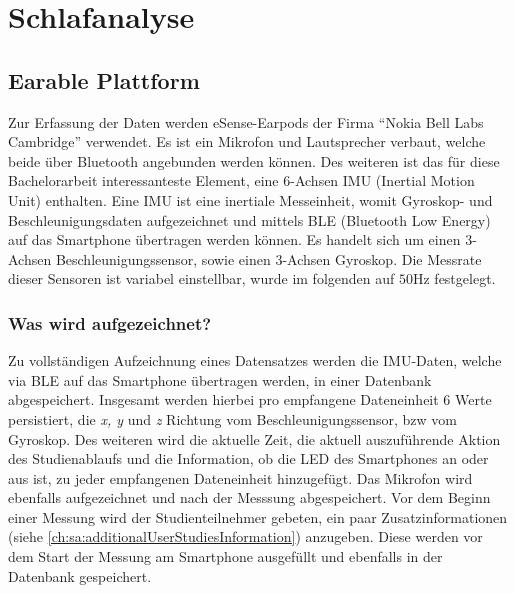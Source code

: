 
\chapter{Schlafanalyse}
\label{ch:sa}

\section{Earable Plattform}
\label{ch:sa:ep}
Zur Erfassung der Daten werden eSense-Earpods der Firma ``Nokia Bell Labs Cambridge'' verwendet.	
Es ist ein Mikrofon und Lautsprecher verbaut, welche beide über Bluetooth angebunden werden können. 
Des weiteren ist das für diese Bachelorarbeit interessanteste Element, eine 6-Achsen IMU (Inertial Motion Unit) enthalten.
Eine IMU ist eine inertiale Messeinheit, womit Gyroskop- und Beschleunigungsdaten aufgezeichnet und mittels BLE (Bluetooth Low Energy) auf das Smartphone übertragen werden können. 
Es handelt sich um einen 3-Achsen Beschleunigungssensor, sowie einen 3-Achsen Gyroskop.
Die Messrate dieser Sensoren ist variabel einstellbar, wurde im folgenden auf $50 \si{\hertz}$ festgelegt.





\subsection{Was wird aufgezeichnet?}
\label{ch:sa:ep:what_to_record}
Zu vollständigen Aufzeichnung eines Datensatzes werden die IMU-Daten, welche via BLE auf das Smartphone übertragen werden, in einer Datenbank abgespeichert.
Insgesamt werden hierbei pro empfangene Dateneinheit 6 Werte persistiert, die \textit{x, y} und \textit{z} Richtung vom Beschleunigungssensor, bzw vom Gyroskop. 
Des weiteren wird die aktuelle Zeit, die aktuell auszuführende Aktion des Studienablaufs und die Information, ob die LED des Smartphones an oder aus ist, zu jeder empfangenen Dateneinheit hinzugefügt.
Das Mikrofon wird ebenfalls aufgezeichnet und nach der Messsung abgespeichert.
Vor dem Beginn einer Messung wird der Studienteilnehmer gebeten, ein paar Zusatzinformationen (siehe \ref{ch:sa:additionalUserStudiesInformation}) anzugeben.
Diese werden vor dem Start der Messung am Smartphone ausgefüllt und ebenfalls in der Datenbank gespeichert.

